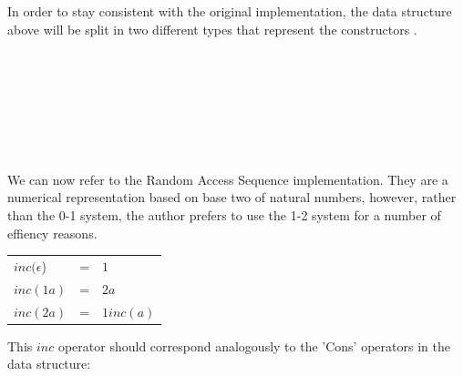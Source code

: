 \documentclass[12pt,twoside,notitlepage]{report}
\begin{document}
In order to stay consistent with the original implementation, the data structure above will be split in two different types that represent the constructors \cite{numerical}.

\begin{code}
\\
\>[2]\<[4]%
\>[4]  \AgdaSymbol{(} \AgdaSymbol{:} \AgdaSymbol{)} \AgdaSymbol{:}  \<%
\\
\>[4]\<[6]%
\>[6] \AgdaSymbol{:}    \<%
\\
%
\\
\>[0]\<[4]%
\>[4]  \AgdaSymbol{(} \AgdaSymbol{:}   \AgdaSymbol{)(} \AgdaSymbol{:} \AgdaSymbol{)} \AgdaSymbol{:}  \<%
\\
\>[4]\<[6]%
\>[6] \AgdaSymbol{:} \AgdaSymbol{(} \AgdaSymbol{)}  \AgdaSymbol{(} \AgdaSymbol{)}    \<%
\\
\end{code}


We can now refer to the Random Access Sequence implementation.
They are a numerical representation based on base two of natural numbers, however, rather than the 0-1 system, the author prefers to use the 1-2 system for a number of effiency reasons.

\begin{center}
	\begin{tabular}{lcl}
	$inc(\epsilon$) & = & $1$ \\
	$inc(1a)$ & = & $2a$ \\ 
	$inc(2a)$ & = & $1inc(a)$ \\
	\end{tabular} 
\end{center}

This $inc$ operator should correspond analogously to the 'Cons' operators in the data structure:
\end{document}
